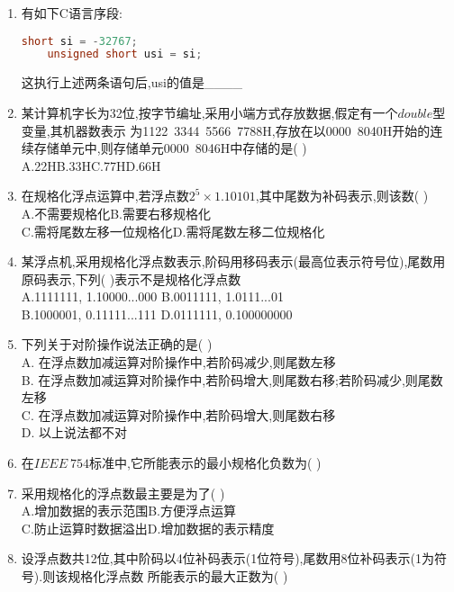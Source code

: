 \documentclass[12pt, a4paper, oneside, UTF8]{ctexbook}
\begin{document}
\begin{enumerate}
    \item \bt 有如下C语言序段:
\begin{lstlisting}[language=C]
    short si = -32767;
    unsigned short usi = si;
\end{lstlisting}
    这执行上述两条语句后,usi的值是\_\_\_\_ 

    \item 某计算机字长为32位,按字节编址,采用小端方式存放数据,假定有一个$double$型变量,其机器数表示
    为1122\ 3344\ 5566\ 7788H,存放在以0000\ 8040H开始的连续存储单元中,则存储单元0000\ 8046H中存储的是(   )\\
    A.22H\qquad B.33H\qquad C.77H\qquad D.66H 

    \item 在规格化浮点运算中,若浮点数$2^5\times1.10101$,其中尾数为补码表示,则该数(   ) \\
    A.不需要规格化\qquad B.需要右移规格化 \\
    C.需将尾数左移一位规格化\qquad D.需将尾数左移二位规格化 

    \item 某浮点机,采用规格化浮点数表示,阶码用移码表示(最高位表示符号位),尾数用原码表示,下列(   )表示不是规格化浮点数 \\
    A.1111111, 1.10000...000 \qquad B.0011111, 1.0111...01 \\
    B.1000001, 0.11111...111 \qquad D.0111111, 0.100000000 

    \item 下列关于对阶操作说法正确的是(   ) \\
    A. 在浮点数加减运算对阶操作中,若阶码减少,则尾数左移 \\
    B. 在浮点数加减运算对阶操作中,若阶码增大,则尾数右移;若阶码减少,则尾数左移 \\
    C. 在浮点数加减运算对阶操作中,若阶码增大,则尾数右移 \\
    D. 以上说法都不对 

    \item 在$IEEE\ 754$标准中,它所能表示的最小规格化负数为(    )

    \item 采用规格化的浮点数最主要是为了(   ) \\
    A.增加数据的表示范围\qquad B.方便浮点运算\\
    C.防止运算时数据溢出\qquad D.增加数据的表示精度 

    \item 设浮点数共12位,其中阶码以4位补码表示(1位符号),尾数用8位补码表示(1为符号).则该规格化浮点数
    所能表示的最大正数为(    ) 


\end{enumerate}
\end{document}

